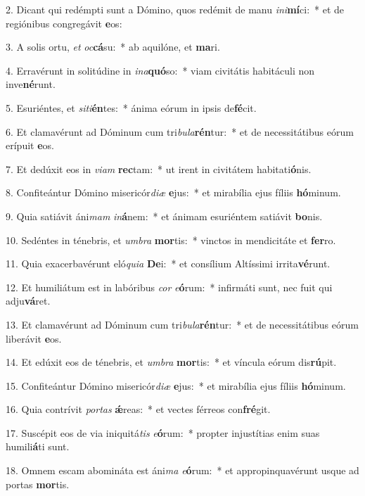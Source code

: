 2. Dicant qui redémpti sunt a Dómino, quos redémit de manu \textit{in}\textit{i}\textbf{mí}ci:~*  et de regiónibus congregávit \textbf{e}os:\

3. A solis ortu, \textit{et} \textit{oc}\textbf{cá}su:~*  ab aquilóne, et \textbf{ma}ri.\

4. Erravérunt in solitúdine in \textit{in}\textit{a}\textbf{quó}so:~*  viam civitátis habitáculi non inve\textbf{né}runt.\

5. Esuriéntes, et \textit{si}\textit{ti}\textbf{én}tes:~*  ánima eórum in ipsis de\textbf{fé}cit.\

6. Et clamavérunt ad Dóminum cum tri\textit{bu}\textit{la}\textbf{rén}tur:~*  et de necessitátibus eórum erípuit \textbf{e}os.\

7. Et dedúxit eos in \textit{vi}\textit{am} \textbf{rec}tam:~*  ut irent in civitátem habitati\textbf{ó}nis.\

8. Confiteántur Dómino misericór\textit{di}\textit{æ} \textbf{e}jus:~*  et mirabília ejus fíliis \textbf{hó}minum.\

9. Quia satiávit áni\textit{mam} \textit{in}\textbf{á}nem:~*  et ánimam esuriéntem satiávit \textbf{bo}nis.\

10. Sedéntes in ténebris, et \textit{um}\textit{bra} \textbf{mor}tis:~*  vinctos in mendicitáte et \textbf{fer}ro.\

11. Quia exacerbavérunt eló\textit{qui}\textit{a} \textbf{De}i:~*  et consílium Altíssimi irrita\textbf{vé}runt.\

12. Et humiliátum est in labóribus \textit{cor} \textit{e}\textbf{ó}rum:~*  infirmáti sunt, nec fuit qui adju\textbf{vá}ret.\

13. Et clamavérunt ad Dóminum cum tri\textit{bu}\textit{la}\textbf{rén}tur:~*  et de necessitátibus eórum liberávit \textbf{e}os.\

14. Et edúxit eos de ténebris, et \textit{um}\textit{bra} \textbf{mor}tis:~*  et víncula eórum dis\textbf{rú}pit.\

15. Confiteántur Dómino misericór\textit{di}\textit{æ} \textbf{e}jus:~*  et mirabília ejus fíliis \textbf{hó}minum.\

16. Quia contrívit \textit{por}\textit{tas} \textbf{ǽ}reas:~*  et vectes férreos con\textbf{fré}git.\

17. Suscépit eos de via iniquitá\textit{tis} \textit{e}\textbf{ó}rum:~*  propter injustítias enim suas humili\textbf{á}ti sunt.\

18. Omnem escam abomináta est áni\textit{ma} \textit{e}\textbf{ó}rum:~*  et appropinquavérunt usque ad portas \textbf{mor}tis.\

